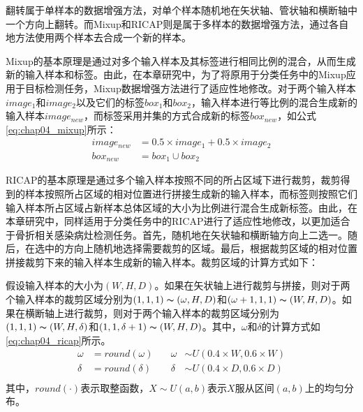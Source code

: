 翻转属于单样本的数据增强方法，对单个样本随机地在矢状轴、管状轴和横断轴中一个方向上翻转。而Mixup和RICAP则是属于多样本的数据增强方法，通过各自地方法使用两个样本去合成一个新的样本。

Mixup的基本原理是通过对多个输入样本及其标签进行相同比例的混合，从而生成新的输入样本和标签。由此，在本章研究中，为了将原用于分类任务中的Mixup应用于目标检测任务，Mixup数据增强方法进行了适应性地修改。对于两个输入样本\(image_1\)和\(image_2\)以及它们的标签\(box_1\)和\(box_2\)，输入样本进行等比例的混合生成新的输入样本\(image_{new}\)，而标签采用并集的方式合成新的标签\(box_{new}\)，如公式\ref{eq:chap04_mixup}所示：
\begin{equation}
  \begin{aligned}
    image_{new} & = 0.5 \times image_1 + 0.5 \times image_2 \\
    box_{new}   & = box_1 \cup box_2
  \end{aligned}
  \label{eq:chap04_mixup}
\end{equation}

RICAP的基本原理是通过多个输入样本按照不同的所占区域下进行裁剪，裁剪得到的样本按照所占区域的相对位置进行拼接生成新的输入样本，而标签则按照它们输入样本所占区域占新样本总体区域的大小为比例进行混合生成新标签。由此，在本章研究中，同样适用于分类任务中的RICAP进行了适应性地修改，以更加适合于骨折相关感染病灶检测任务。首先，随机地在矢状轴和横断轴方向上二选一。随后，在选中的方向上随机地选择需要裁剪的区域。最后，根据裁剪区域的相对位置拼接裁剪下来的输入样本生成新的输入样本。裁剪区域的计算方式如下：

假设输入样本的大小为\((W,H,D)\)。如果在矢状轴上进行裁剪与拼接，则对于两个输入样本的裁剪区域分别为\((1, 1, 1)\thicksim (\omega, H, D)\)和\((\omega + 1, 1, 1)\thicksim (W, H, D)\)。如果在横断轴上进行裁剪，则对于两个输入样本的裁剪区域分别为\((1, 1, 1)\thicksim (W, H, \delta)\)和\((1, 1, \delta + 1)\thicksim (W, H, D)\)。其中，\(\omega\)和\(\delta\)的计算方式如\ref{eq:chap04_ricap}所示。
\begin{equation}
  \begin{aligned}
    \omega & = round(\omega) & \quad \omega & \sim U(0.4\times W, 0.6 \times W) \\
    \delta & = round(\delta) & \quad \delta & \sim U(0.4\times D, 0.6 \times D) \\
  \end{aligned}
  \label{eq:chap04_ricap}
\end{equation}
其中，\(round(\cdot)\)表示取整函数，\(X \sim U(a, b)\)表示\(X\)服从区间\((a,b)\)上的均匀分布。

